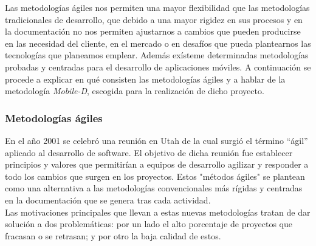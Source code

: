 Las metodologías ágiles nos permiten una mayor flexibilidad que las metodologías tradicionales de desarrollo, que debido a una mayor rigidez en sus procesos y en la documentación no nos permiten ajustarnos a cambios que pueden producirse en las necesidad del cliente, en el mercado o en desafíos que pueda plantearnos las tecnologías que planeamos emplear. Además exísteme determinadas metodologías probadas y centradas para el desarrollo de aplicaciones móviles. A continuación se procede a explicar en qué consisten las metodologías ágiles y a hablar de la metodología \textit{Mobile-D}, escogida para la realización de dicho proyecto.

\subsubsection*{Metodologías ágiles}
En el año 2001 se celebró una reunión en Utah de la cual surgió el término ``ágil'' aplicado al desarrollo de software. El objetivo de dicha reunión fue establecer principios y valores que permitirían a equipos de desarrollo agilizar y responder a todo los cambios que surgen en los proyectos. Estos "métodos ágiles" se plantean como una alternativa a las metodologías convencionales más rígidas y centradas en la documentación que se genera tras cada actividad. \\

Las motivaciones principales que llevan a estas nuevas metodologías tratan de dar solución a dos problemáticas: por un lado el alto porcentaje de proyectos que fracasan o se retrasan; y por otro la baja calidad de estos\cite{metodologidesarrollo2009}. \\

